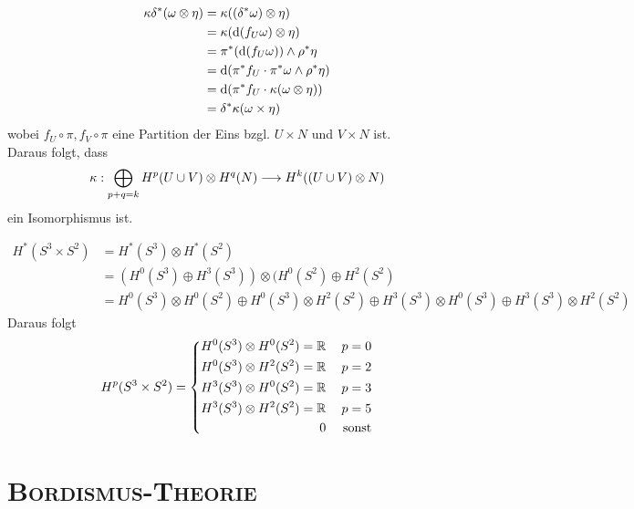 \begin{Beweis}{}
\begin{align*}
\kappa \delta^*(\omega \otimes \eta) 
&= \kappa((\delta^*\omega) \otimes \eta)\\
&= \kappa(\text{d} (f_U\omega) \otimes \eta )\\
&= \pi^*(\text{d} (f_U\omega)) \wedge \rho^*\eta\\
&= \text{d} (\pi^*f_U \cdot \pi^*\omega \wedge \rho^*\eta)\\
&= \text{d} (\pi^*f_U \cdot \kappa(\omega \otimes \eta))\\
&= \delta^*\kappa(\omega \times \eta)
\end{align*}
wobei $f_U\circ \pi, f_V \circ \pi$ eine Partition der Eins bzgl. $U\times N$ und $V\times N$ ist.\\
Daraus folgt, dass
\[ \kappa : \bigoplus\limits_{p+q = k}H^p(U\cup V)\otimes H^q(N) \overset{}{\longrightarrow} H^k((U\cup V) \otimes N) \]
ein Isomorphismus ist.
\end{Beweis}

\Bsp{}
\begin{align*}
H^*(S^3 \times S^2)&=H^*(S^3)\otimes H^*(S^2)\\
&= (H^0(S^3)\oplus H^3(S^3)) \otimes (H^0(S^2) \oplus H^2(S^2)\\
&= H^0(S^3)\otimes H^0(S^2) \oplus H^0(S^3) \otimes H^2(S^2) 
\oplus H^3(S^3) \otimes H^0(S^3) \oplus H^3(S^3)\otimes H^2(S^2)
\end{align*}
Daraus folgt
\begin{align*}
H^p(S^3 \times S^2) =
\left\lbrace
\begin{aligned}
H^0(S^3)\otimes H^0(S^2) = \mathbb{R} && p= 0\\
H^0(S^3)\otimes H^2(S^2) = \mathbb{R} && p= 2\\
H^3(S^3)\otimes H^0(S^2) = \mathbb{R} && p= 3\\
H^3(S^3)\otimes H^2(S^2) = \mathbb{R} && p= 5\\
0 && \text{ sonst}
\end{aligned}
\right.
\end{align*}

\chapter{\textsc{Bordismus-Theorie}}

